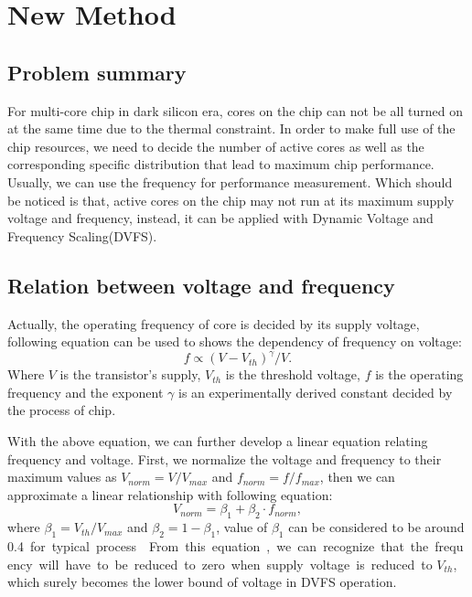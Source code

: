 \section{New Method}
\subsection{Problem summary}
For multi-core chip in dark silicon era, cores on the chip can not be all turned on at the same time due to the
thermal constraint. In order to make full use of the chip resources, we need to decide the number of active cores as
well as the corresponding specific distribution that lead to maximum chip performance. Usually, we can use the frequency
for performance measurement. Which should be noticed is that, active cores on the chip may not run at its maximum supply voltage
and frequency, instead, it can be applied with Dynamic Voltage and Frequency Scaling(DVFS).
\subsection{Relation between voltage and frequency}
Actually, the operating frequency of core is decided by its supply voltage, following equation can be used to shows the dependency
of frequency on voltage:
\begin{equation}\label{v_and_f}
f \propto (V-V_{th})^{\gamma}/V.
\end{equation}
Where $V$ is the transistor's supply, $V_{th}$ is the threshold voltage, $f$ is the operating frequency and the exponent
$\gamma$ is an experimentally derived constant decided by the process of chip.

With the above equation, we can further develop a linear equation relating frequency and voltage. First, we normalize the
voltage and frequency to their maximum values as $V_{norm}=V/V_{max}$ and $f_{norm}=f/f_{max}$, then we can approximate a linear
relationship with following equation:
\begin{equation}\label{V_and_f_linear}
V_{norm} = \beta_1+\beta_2 \cdot f_{norm},
\end{equation}
where $\beta_1=V_{th}/V_{max}$ and $\beta_2=1-\beta_1$, value of $\beta_1$ can be considered to be around \SI{0.4} for typical process\cite{Taylor:MICRO'13}.
From this equation, we can recognize that the frequency will have to be reduced to zero when supply voltage is reduced to $V_{th}$,
which surely becomes the lower bound of voltage in DVFS operation.
